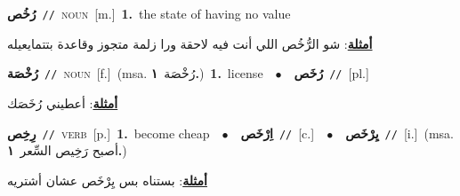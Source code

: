 \documentclass[10pt,a4paper,twoside]{article} %
\begin{document}
\begin{multicols}{2}
{\setlength\topsep{0pt}\textbf{\foreignlanguage{arabic}{رُخُص}}\ {\color{gray}\texttt{//}\color{black}}\ \textsc{noun}\ [m.]\ \textbf{1.}~the state of having no value\  \begin{flushright}\color{gray}\foreignlanguage{arabic}{\textbf{\underline{\foreignlanguage{arabic}{أمثلة}}}: شو الرُّخُص اللي أنت فيه لاحقة ورا زلمة متجوز وقاعدة بتتمايعيله}\end{flushright}\color{black}} \vspace{2mm}

{\setlength\topsep{0pt}\textbf{\foreignlanguage{arabic}{رُخْصَة}}\ {\color{gray}\texttt{//}\color{black}}\ \textsc{noun}\ [f.]\ \color{gray}(msa. \foreignlanguage{arabic}{رُخْصَة}~\foreignlanguage{arabic}{\textbf{١.}})\color{black}\ \textbf{1.}~license\ \ $\bullet$\ \ \setlength\topsep{0pt}\textbf{\foreignlanguage{arabic}{رُخَص}}\ {\color{gray}\texttt{//}\color{black}}\ [pl.]\  \begin{flushright}\color{gray}\foreignlanguage{arabic}{\textbf{\underline{\foreignlanguage{arabic}{أمثلة}}}: أعطيني رُخَصَك}\end{flushright}\color{black}} \vspace{2mm}

{\setlength\topsep{0pt}\textbf{\foreignlanguage{arabic}{رِخِص}}\ {\color{gray}\texttt{//}\color{black}}\ \textsc{verb}\ [p.]\ \textbf{1.}~become cheap\ \ $\bullet$\ \ \setlength\topsep{0pt}\textbf{\foreignlanguage{arabic}{اِرْخَص}}\ {\color{gray}\texttt{//}\color{black}}\ [c.]\ \ $\bullet$\ \ \setlength\topsep{0pt}\textbf{\foreignlanguage{arabic}{يِرْخَص}}\ {\color{gray}\texttt{//}\color{black}}\ [i.]\ \color{gray}(msa. \foreignlanguage{arabic}{أصبح رَخِيص السِّعر}~\foreignlanguage{arabic}{\textbf{١.}})\color{black}\  \begin{flushright}\color{gray}\foreignlanguage{arabic}{\textbf{\underline{\foreignlanguage{arabic}{أمثلة}}}: بستناه بس يِرْخَص عشان أشتريه}\end{flushright}\color{black}} \vspace{2mm}


\end{multicols}
\end{document}
